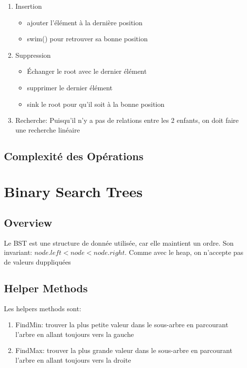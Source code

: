 \documentclass{article}
\begin{document}
\begin{enumerate}
    \item Insertion
	\begin{itemize}
	    \item ajouter l'élément à la dernière position
	    \item swim() pour retrouver sa bonne position
	\end{itemize}
    \item Suppression
    \begin{itemize}
        \item Échanger le root avec le dernier élément
	\item supprimer le dernier élément
	\item sink le root pour qu'il soit à la bonne position
    \end{itemize}
    \item Recherche: Puisqu'il n'y a pas de relations entre les
	2 enfants, on doit faire une recherche linéaire
\end{enumerate}

\subsection{Complexité des Opérations}%
\label{sub:Complexité des Opérations}


\section{Binary Search Trees}

\subsection{Overview}%
\label{sub:Overview}

Le BST est une structure de donnée utilisée, car elle maintient un ordre.
Son invariant: $ node.left < node < node.right $. Comme avec le heap,
on n'accepte pas de valeurs duppliquées

\subsection{Helper Methods}%
\label{sub:Helper Methods}

Les helpers methods sont:
\begin{enumerate}
    \item FindMin: trouver la plus petite valeur dans le sous-arbre en
	parcourant l'arbre en allant toujours vers la gauche
    \item FindMax: trouver la plus grande valeur dans le sous-arbre en
	parcourant l'arbre en allant toujours vers la droite
\end{enumerate}
\end{document}

